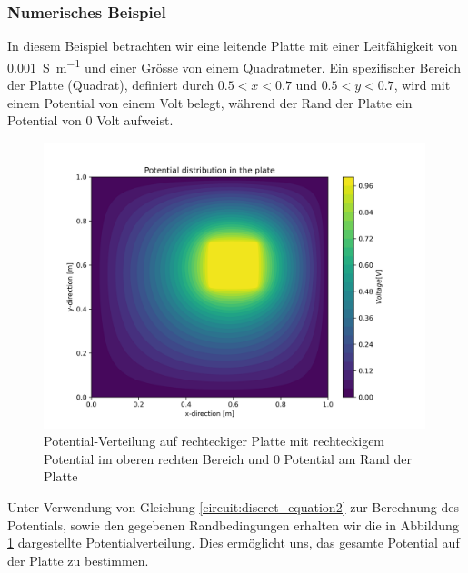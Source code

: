 \subsubsection{Numerisches Beispiel}
In diesem Beispiel betrachten wir eine leitende Platte mit einer Leitfähigkeit von \SI{0.001}{\siemens\per\meter} und einer Grösse von einem Quadratmeter. Ein spezifischer Bereich der Platte (Quadrat), definiert durch $0.5 < x < 0.7$ und $0.5 < y < 0.7$, wird mit einem Potential von einem Volt belegt, während der Rand der Platte ein Potential von 0 Volt aufweist.
\begin{figure}
	\centering
	\includegraphics[width=0.99\textwidth]{papers/circuit/potential_distribution.png}
	\caption{Potential-Verteilung auf rechteckiger Platte mit rechteckigem Potential im oberen rechten Bereich und 0 Potential am Rand der Platte \cite{github:AndreasFMueller}}
	\label{fig:potential_distribution}
\end{figure}
Unter Verwendung von Gleichung \eqref{circuit:discret_equation2} zur Berechnung des Potentials, sowie den gegebenen Randbedingungen erhalten wir die in Abbildung \ref{fig:potential_distribution} dargestellte Potentialverteilung. Dies ermöglicht uns, das gesamte Potential auf der Platte zu bestimmen.

